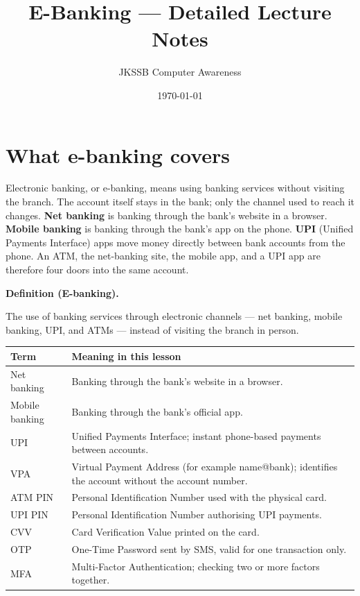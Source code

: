 \documentclass[11pt]{article}
\title{E-Banking --- Detailed Lecture Notes}
\author{JKSSB Computer Awareness}
\date{\today}
\newenvironment{definitionbox}[1]{%
  \par\noindent\textbf{Definition (#1).}\ \itshape
}{\par\vspace{0.3em}}
\begin{document}
\maketitle

\section{What e-banking covers}
Electronic banking, or e-banking, means using banking services without
visiting the branch. The account itself stays in the bank; only the channel
used to reach it changes. \textbf{Net banking} is banking through the bank's
website in a browser. \textbf{Mobile banking} is banking through the bank's
app on the phone. \textbf{UPI} (Unified Payments Interface) apps move money
directly between bank accounts from the phone. An ATM, the net-banking site,
the mobile app, and a UPI app are therefore four doors into the same
account.

\begin{definitionbox}{E-banking}
The use of banking services through electronic channels --- net banking,
mobile banking, UPI, and ATMs --- instead of visiting the branch in person.
\end{definitionbox}

\begin{center}
\begin{tabular}{p{}p{}}
\toprule
\textbf{Term} & \textbf{Meaning in this lesson} \\
\midrule
Net banking & Banking through the bank's website in a browser. \\
Mobile banking & Banking through the bank's official app. \\
UPI & Unified Payments Interface; instant phone-based payments between accounts. \\
VPA & Virtual Payment Address (for example name@bank); identifies the account without the account number. \\
ATM PIN & Personal Identification Number used with the physical card. \\
UPI PIN & Personal Identification Number authorising UPI payments. \\
CVV & Card Verification Value printed on the card. \\
OTP & One-Time Password sent by SMS, valid for one transaction only. \\
MFA & Multi-Factor Authentication; checking two or more factors together. \\
\bottomrule
\end{tabular}
\end{center}
\end{document}
